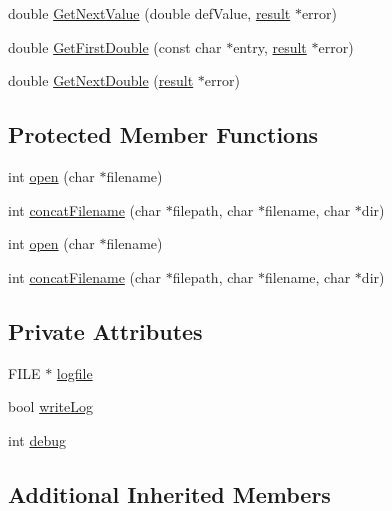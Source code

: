 \begin{DoxyCompactItemize}
\item 
double \hyperlink{classakInifile_a563076300ca6e4dd46850b27bc326aa6}{Get\-Next\-Value} (double def\-Value, \hyperlink{classInifile_a42a1cfa6fc8618c8b28d449626f0ecde}{result} $\ast$error)
\item 
double \hyperlink{classakInifile_a8121e22f645f39782132d198edc7ebd7}{Get\-First\-Double} (const char $\ast$entry, \hyperlink{classInifile_a42a1cfa6fc8618c8b28d449626f0ecde}{result} $\ast$error)
\item 
double \hyperlink{classakInifile_ad9c214f487ee936f5f8e83851a8e74e2}{Get\-Next\-Double} (\hyperlink{classInifile_a42a1cfa6fc8618c8b28d449626f0ecde}{result} $\ast$error)
\end{DoxyCompactItemize}
\subsection*{Protected Member Functions}
\begin{DoxyCompactItemize}
\item 
int \hyperlink{classakInifile_a9c1ec6087e2f42a2797d155738201e88}{open} (char $\ast$filename)
\item 
int \hyperlink{classakInifile_a91f29a8ed73a9d9d5172debad7519850}{concat\-Filename} (char $\ast$filepath, char $\ast$filename, char $\ast$dir)
\item 
int \hyperlink{classakInifile_a9c1ec6087e2f42a2797d155738201e88}{open} (char $\ast$filename)
\item 
int \hyperlink{classakInifile_a91f29a8ed73a9d9d5172debad7519850}{concat\-Filename} (char $\ast$filepath, char $\ast$filename, char $\ast$dir)
\end{DoxyCompactItemize}
\subsection*{Private Attributes}
\begin{DoxyCompactItemize}
\item 
F\-I\-L\-E $\ast$ \hyperlink{classakInifile_a9c55ea25efdedced0815835562454354}{logfile}
\item 
bool \hyperlink{classakInifile_aa1cb47c582ed7c93aae1a9ecfff6b0c2}{write\-Log}
\item 
int \hyperlink{classakInifile_a0b8a73d04d2b7a677bd61af9d87faec3}{debug}
\end{DoxyCompactItemize}
\subsection*{Additional Inherited Members}


